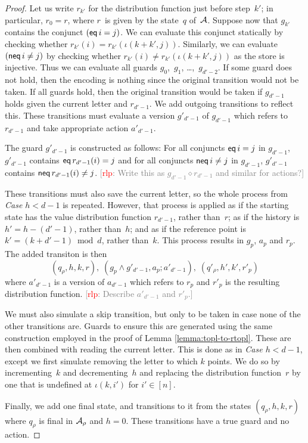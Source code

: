 \documentclass{article} %
\newcommand{\noterg}[2]{\textcolor{gray}{[\textcolor{red}{#1}: #2]}}
\newcommand{\rlp}[1]{\noterg{rlp}{#1}}
\theoremstyle{definition}
\theoremstyle{remark}
\begin{document}
\begin{proof}
Let us write $r_{k'}$ for the distribution function just before step~$k'$; in particular, $r_0=r$, where $r$~is given by the state~$q$ of~${\cal A}$.
Suppose now that $g_{k'}$ contains the conjunct $({\sf eq}\,i=j)$.
We can evaluate this conjunct statically by checking whether $r_{k'}(i)=r_{k'}(\iota(k+k',j))$.
Similarly, we can evaluate $({\sf neq}\,i\ne j)$ by checking whether $r_{k'}(i)\ne r_{k'}(\iota(k+k',j))$ as the store is injective.
Thus we can evaluate all guards $g_0$,~$g_1$, \dots,~$g_{d'-2}$.
If some guard does not hold, then the encoding is nothing since the original transition would not be taken.
If all guards hold, then the original transition would be taken if $g_{d'-1}$ holds given the current letter and $r_{d'-1}$. We add outgoing transitions to reflect this.
These transitions must evaluate a version $g'_{d'-1}$ of $g_{d'-1}$ which refers to $r_{d'-1}$ and take appropriate action $a'_{d'-1}$.

The guard $g'_{d'-1}$ is constructed as follows:
For all conjuncts ${\sf eq}\,i=j$ in $g_{d'-1}$, $g'_{d'-1}$ contains ${\sf eq}\,r_{d'-1}(i)=j$ and
for all conjuncts ${\sf neq}\,i\ne j$ in $g_{d'-1}$, $g'_{d'-1}$ contains ${\sf neq}\,r_{d'-1}(i)\ne j$.
\rlp{Write this as $g_{d'-1}\diamond r_{d'-1}$ and similar for actions?}

These transitions must also save the current letter, so the whole process from {\it Case $h<d-1$} is repeated.
However, that process is applied as if the starting state has the value distribution function $r_{d'-1}$, rather than~$r$; as if the history is $h' = h-(d'-1)$, rather than~$h$; and as if the reference point is $k' = (k+d'-1)\bmod d$, rather than~$k$.
This process results in $g_p$, $a_p$ and $r_p$.
The added transiton is then
\[
 (q_\rho,h,k,r),\;(g_p \land g'_{d'-1},a_p;a'_{d'-1}),\;(q'_\rho,h',k',r'_p)
\]
where $a'_{d'-1}$ is a version of $a_{d'-1}$ which refers to $r_p$ and $r'_p$ is the resulting distribution function.
\rlp{Describe $a'_{d'-1}$ and $r'_p$.}

We must also simulate a skip transition, but only to be taken in case none of the other transitions are.
Guards to ensure this are generated using the same construction employed in the proof of Lemma \ref{lemma:topl-to-rtopl}.
These are then combined with reading the current letter.
This is done as in {\it Case $h<d-1$}, except we first simulate removing the letter to which $k$ points.
We do so by incrementing~$k$ and decrementing~$h$ and
 replacing the distribution function~$r$ by one that is undefined at $\iota(k,i')$ for $i'\in[n]$.

\smallskip
Finally, we add one final state, and transitions to it from the states $(q_\rho, h, k, r)$ where $q_\rho$ is final in ${\cal A}_\rho$ and $h=0$.
These transitions have a true guard and no action.
\end{proof}
\end{document}
